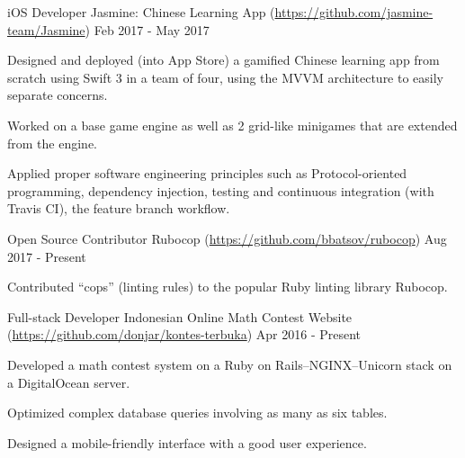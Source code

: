 

\begin{cventries}

	\cventry
	{iOS Developer} %
	{Jasmine: Chinese Learning App (\url{https://github.com/jasmine-team/Jasmine})} %
	{} %
	{Feb 2017 - May 2017} %
	{
		\begin{cvitems} %
		\item {Designed and deployed (into App Store) a gamified Chinese learning app from scratch using Swift 3 in a team of four, using the MVVM architecture to easily separate concerns.}
		\item {Worked on a base game engine as well as 2 grid-like minigames that are extended from the engine.}
		\item {Applied proper software engineering principles such as Protocol-oriented programming, dependency injection, testing and continuous integration (with Travis CI), the feature branch workflow.}
		\end{cvitems}
	}

	\cventry
	{Open Source Contributor} %
	{Rubocop (\url{https://github.com/bbatsov/rubocop})} %
	{} %
	{Aug 2017 - Present} %
	{
		\begin{cvitems} %
		\item {Contributed ``cops'' (linting rules) to the popular Ruby linting library Rubocop.}
		\end{cvitems}
	}

	\cventry
	{Full-stack Developer} %
	{Indonesian Online Math Contest Website (\url{https://github.com/donjar/kontes-terbuka})} %
	{} %
	{Apr 2016 - Present} %
	{
		\begin{cvitems} %
		\item {Developed a math contest system on a Ruby on Rails--NGINX--Unicorn stack on a DigitalOcean server.}
		\item {Optimized complex database queries involving as many as six tables.}
		\item {Designed a mobile-friendly interface with a good user experience.}
		\end{cvitems}
	}

\end{cventries}
